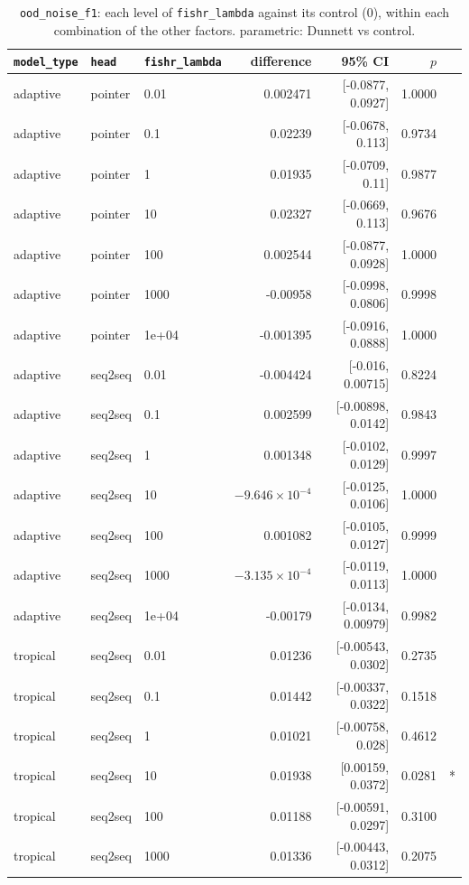 \documentclass[10pt]{article}
\begin{document}
{\small
\begin{longtable}{lllrrrl}
\caption{\texttt{ood\_noise\_f1}: each level of \texttt{fishr\_lambda} against its control (0), within each combination of the other factors. parametric: Dunnett vs control.}\label{tab:control-ood_noise_f1}\\
\toprule
\texttt{model\_type} & \texttt{head} & \texttt{fishr\_lambda} & difference & 95\% CI & $p$ & \\
\midrule
\endhead
adaptive & pointer & 0.01 & 0.002471 & [-0.0877, 0.0927] & 1.0000 & \\
adaptive & pointer & 0.1 & 0.02239 & [-0.0678, 0.113] & 0.9734 & \\
adaptive & pointer & 1 & 0.01935 & [-0.0709, 0.11] & 0.9877 & \\
adaptive & pointer & 10 & 0.02327 & [-0.0669, 0.113] & 0.9676 & \\
adaptive & pointer & 100 & 0.002544 & [-0.0877, 0.0928] & 1.0000 & \\
adaptive & pointer & 1000 & -0.00958 & [-0.0998, 0.0806] & 0.9998 & \\
adaptive & pointer & 1e+04 & -0.001395 & [-0.0916, 0.0888] & 1.0000 & \\
adaptive & seq2seq & 0.01 & -0.004424 & [-0.016, 0.00715] & 0.8224 & \\
adaptive & seq2seq & 0.1 & 0.002599 & [-0.00898, 0.0142] & 0.9843 & \\
adaptive & seq2seq & 1 & 0.001348 & [-0.0102, 0.0129] & 0.9997 & \\
adaptive & seq2seq & 10 & $-9.646\times10^{-4}$ & [-0.0125, 0.0106] & 1.0000 & \\
adaptive & seq2seq & 100 & 0.001082 & [-0.0105, 0.0127] & 0.9999 & \\
adaptive & seq2seq & 1000 & $-3.135\times10^{-4}$ & [-0.0119, 0.0113] & 1.0000 & \\
adaptive & seq2seq & 1e+04 & -0.00179 & [-0.0134, 0.00979] & 0.9982 & \\
tropical & seq2seq & 0.01 & 0.01236 & [-0.00543, 0.0302] & 0.2735 & \\
tropical & seq2seq & 0.1 & 0.01442 & [-0.00337, 0.0322] & 0.1518 & \\
tropical & seq2seq & 1 & 0.01021 & [-0.00758, 0.028] & 0.4612 & \\
tropical & seq2seq & 10 & 0.01938 & [0.00159, 0.0372] & 0.0281 & *\\
tropical & seq2seq & 100 & 0.01188 & [-0.00591, 0.0297] & 0.3100 & \\
tropical & seq2seq & 1000 & 0.01336 & [-0.00443, 0.0312] & 0.2075 & \\

\end{longtable}}
\end{document}

